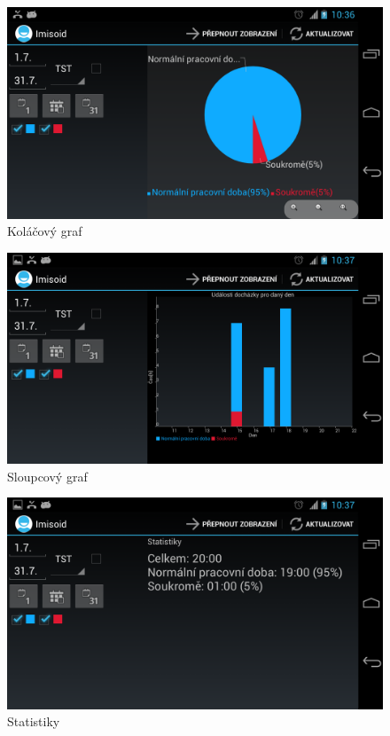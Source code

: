 \documentclass{diplomka}
\begin{document}
\begin{figure}[H]
  \centering
  \includegraphics[scale=0.25]{scr/piechart.png}
  \caption{Koláčový graf}
  \label{fig:piechart}
\end{figure}

\begin{figure}[H]
  \centering
  \includegraphics[scale=0.25]{scr/stackchart.png}
  \caption{Sloupcový graf}
  \label{fig:stackchart}
\end{figure}

\begin{figure}[H]
  \centering
  \includegraphics[scale=0.25]{scr/stats.png}
   \caption{Statistiky}
  \label{fig:stats}
\end{figure}
\vspace{-15 mm}
\end{document}
